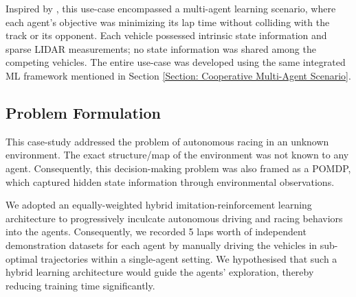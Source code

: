 \documentclass[letterpaper, 10 pt, conference]{ieeeconf}  %
\begin{document}
	Inspired by \cite{AutoRACE-2021}, this use-case encompassed a multi-agent learning scenario, where each agent's objective was minimizing its lap time without colliding with the track or its opponent. Each vehicle possessed intrinsic state information and sparse LIDAR measurements; no state information was shared among the competing vehicles. The entire use-case was developed using the same integrated ML framework mentioned in Section \ref{Section: Cooperative Multi-Agent Scenario}.
	
	\subsection{Problem Formulation}
	\label{Sub-Section: Problem Formulation II}
	
	This case-study addressed the problem of autonomous racing in an unknown environment. The exact structure/map of the environment was not known to any agent. Consequently, this decision-making problem was also framed as a POMDP, which captured hidden state information through environmental observations.
	
	We adopted an equally-weighted hybrid imitation-reinforcement learning architecture to progressively inculcate autonomous driving and racing behaviors into the agents. Consequently, we recorded 5 laps worth of independent demonstration datasets for each agent by manually driving the vehicles in sub-optimal trajectories within a single-agent setting. We hypothesised that such a hybrid learning architecture would guide the agents' exploration, thereby reducing training time significantly.
	
\end{document}
